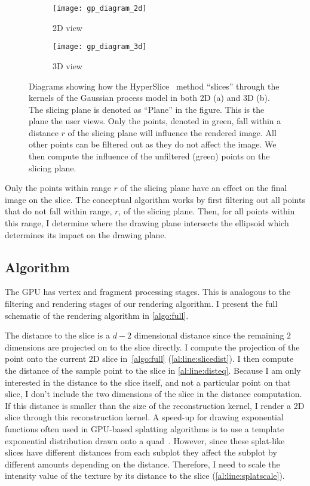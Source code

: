 \begin{figure}[htb]
  \centering
  \begin{subfigure}{0.45\linewidth}
    \centering
    \texttt{[image: gp\_diagram\_2d]}
    \caption{2D view}
    \label{fig:hs_2d}
  \end{subfigure}%
  \begin{subfigure}{0.45\linewidth}
    \centering
    \texttt{[image: gp\_diagram\_3d]}
    \caption{3D view}
    \label{fig:hs_3d}
  \end{subfigure}
  \caption[Example of 2D slices of 2D and 3D spheres]{
    Diagrams showing how the HyperSlice~\cite{Wijk:1993} method ``slices'' 
    through the 
    kernels of the Gaussian process model in both 2D (a) and 3D (b).  The 
    slicing plane is denoted as ``Plane'' in the figure.  This is the 
    plane the user views.  Only the points, denoted in green, fall within a 
    distance $r$ of the slicing
    plane will influence the rendered image.  All other points can be filtered
    out as they do not affect the image.  We then compute the influence of 
    the unfiltered (green) points on the slicing plane.
  }
  \label{fig:hyperslice_geometry}
\end{figure}


Only the points within range $r$ of the slicing plane have an effect on the
final image on the slice.
The conceptual algorithm works by first filtering out all points
that do not fall within range, $r$, of the slicing plane.  Then, for all points
within this range, I determine where the drawing plane intersects the
ellipsoid which determines its impact on the drawing plane.

\subsection{Algorithm}

The GPU has vertex and fragment processing stages.  This is analogous
to the filtering and rendering stages of our rendering algorithm.
I present the full schematic of the rendering algorithm in \autoref{algo:full}.

The distance to the slice is a $d-2$ dimensional distance since the remaining
$2$ dimensions are projected on to the slice directly.
I compute the projection of the point onto the current 2D 
slice in~\autoref{algo:full} (\autoref{al:line:slicedist}).
I then compute the distance of the sample point to the slice in 
\autoref{al:line:disteq}.
Because I am only interested in the distance to the slice itself, and not
a particular point on that slice, I don't include the two dimensions
of the slice in the distance computation.  
If this distance is smaller
than the size of the reconstruction kernel, I render a
2D slice through this reconstruction kernel. 
A speed-up for drawing exponential functions often used
in GPU-based splatting algorithms is to use a template exponential distribution
drawn onto a quad~\cite{Mueller:1998}.
However, since these splat-like slices have different distances from each subplot they affect
the subplot by different amounts depending on the distance.  Therefore, I
need to scale the intensity
value of the texture by its distance to the 
slice (\autoref{al:line:splatscale}).

